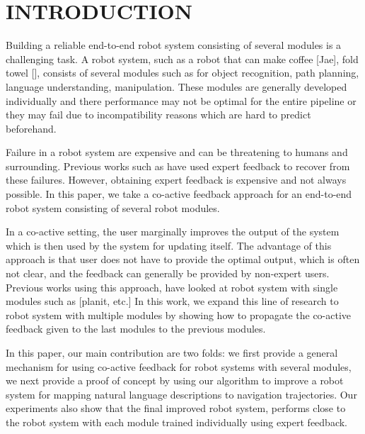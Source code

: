 \section{INTRODUCTION}

Building a reliable end-to-end robot system consisting of several modules is a challenging task.
A robot system, such as a robot that can make coffee [Jae], fold towel [], consists of several
modules such as for object recognition, path planning, language understanding, manipulation. These modules
are generally developed individually and there performance may not be optimal for the entire pipeline or they may fail due to incompatibility reasons which are hard to predict beforehand.

Failure in a robot system are expensive and can be threatening to humans and surrounding. Previous works such as \cite{abeel helicopter} have used expert feedback to recover from these failures. However, obtaining expert feedback is expensive and not always possible. In this paper, we take a co-active feedback approach for an end-to-end robot system consisting of several robot modules. 

In a co-active setting, the user marginally improves the output of the system which is then used by the system for updating itself. The advantage of this approach is that user does not have to provide the optimal output, which is often not clear, and the feedback can generally be provided by non-expert users.
Previous works using this approach, have looked at robot system with single modules such as [planit, etc.] 
In this work, we expand this line of research to robot system with multiple modules by showing how to propagate the co-active feedback given to the last modules to the previous modules.


In this paper, our main contribution are two folds: we first provide a general mechanism
for using co-active feedback for robot systems with several modules, we next provide a proof of concept
by using our algorithm to improve a robot system for mapping natural language descriptions to navigation  trajectories. Our experiments also show that the final improved robot system, performs close to the robot system with each module trained individually using expert feedback.

